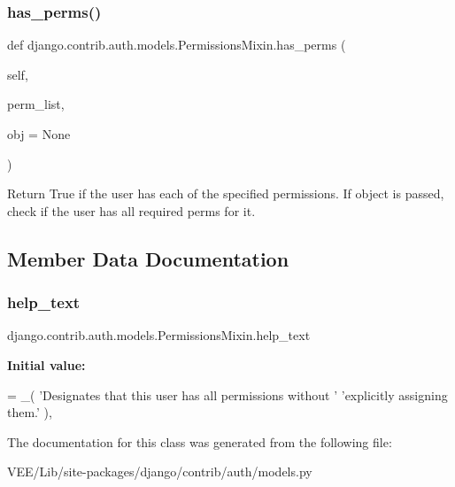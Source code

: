 \subsubsection{\texorpdfstring{has\+\_\+perms()}{has\_perms()}}
{\footnotesize\ttfamily def django.\+contrib.\+auth.\+models.\+Permissions\+Mixin.\+has\+\_\+perms (\begin{DoxyParamCaption}\item[{}]{self,  }\item[{}]{perm\+\_\+list,  }\item[{}]{obj = {\ttfamily None} }\end{DoxyParamCaption})}

\begin{DoxyVerb}Return True if the user has each of the specified permissions. If
object is passed, check if the user has all required perms for it.
\end{DoxyVerb}
 

\subsection{Member Data Documentation}
\mbox{\label{classdjango_1_1contrib_1_1auth_1_1models_1_1_permissions_mixin_a105b72363e73a83e50076e9aaa08f933}} 
\subsubsection{\texorpdfstring{help\+\_\+text}{help\_text}}
{\footnotesize\ttfamily django.\+contrib.\+auth.\+models.\+Permissions\+Mixin.\+help\+\_\+text\hspace{0.3cm}{\ttfamily [static]}}

{\bfseries Initial value\+:}
\begin{DoxyCode}
= \_(
            \textcolor{stringliteral}{'Designates that this user has all permissions without '}
            \textcolor{stringliteral}{'explicitly assigning them.'}
        ),
\end{DoxyCode}


The documentation for this class was generated from the following file\+:\begin{DoxyCompactItemize}
\item 
V\+E\+E/\+Lib/site-\/packages/django/contrib/auth/models.\+py\end{DoxyCompactItemize}
